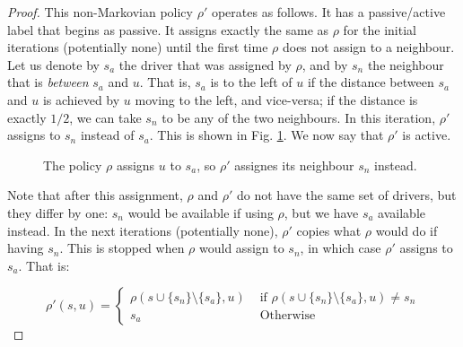 \documentclass[12pt,english]{article}
\begin{document}
{\begin{proof}
This non-Markovian policy $\rho'$ operates as follows. It has a  passive/active label that begins as passive. It assigns exactly the same as $\rho$ for the initial iterations (potentially none) until the first time $\rho$ does not assign to a neighbour. Let us denote by $s_a$ the driver that was assigned by $\rho$, and by $s_n$ the neighbour that is \textit{between} $s_a$ and $u$. That is, $s_a$ is to the left of $u$ if the distance between $s_a$ and $u$ is achieved by $u$ moving to the left, and vice-versa; if the distance is exactly $1/2$, we can take $s_n$ to be any of the two neighbours. In this iteration, $\rho'$ assigns to $s_n$ instead of $s_a$. This is shown in Fig. \ref{fig:NonMarkovianPolicyNeighbours}. We now say that $\rho'$ is active.


\begin{figure}[ht]
\centering
  \caption{The policy $\rho$ assigns $u$ to $s_a$, so $\rho'$ assignes its neighbour $s_n$ instead.}
  \label{fig:NonMarkovianPolicyNeighbours}
\end{figure}

Note that after this assignment, $\rho$ and $\rho'$ do not have the same set of drivers, but they differ by one: $s_n$ would be available if using $\rho$, but we have $s_a$ available instead. In the next iterations (potentially none), $\rho'$ copies what $\rho$ would do if having $s_n$. This is stopped when $\rho$ would assign to $s_n$, in which case $\rho'$ assigns to $s_a$. That is:

\begin{equation}
    \rho'(s,u)=\begin{cases}
       \rho(s\cup \{s_n\} \setminus \{s_a\},u) & \text{ if }  \rho(s\cup \{s_n\} \setminus \{s_a\},u) \neq s_n \\
       s_a & \text{ Otherwise}      
    \end{cases}
\end{equation}


\end{proof}}
\end{document}
